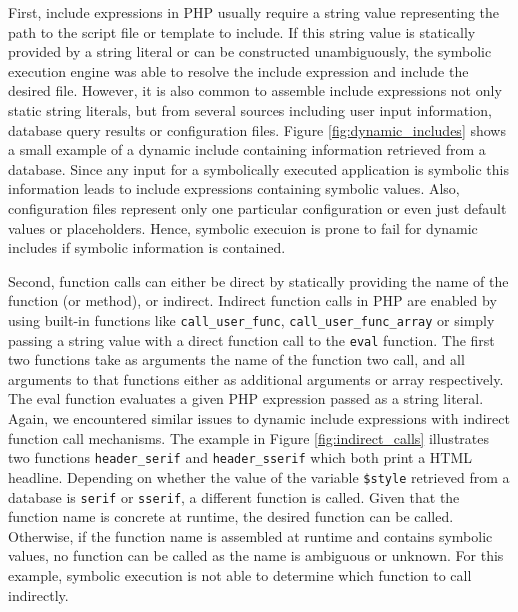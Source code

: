 \documentclass[sigconf]{acmart}
\renewcommand{\tt}[1]{\texttt{#1}}
\begin{document}
First, include expressions in PHP usually require a string value representing
the path to the script file or template to include. If this string value is
statically provided by a string literal or can be constructed unambiguously, the
symbolic execution engine was able to resolve the include expression and include
the desired file. However, it is also common to assemble include expressions not
only static string literals, but from several sources including user input
information, database query results or configuration files. Figure
\ref{fig:dynamic_includes} shows a small example of a dynamic include containing
information retrieved from a database. Since any input for a symbolically
executed application is symbolic this information leads to include expressions
containing symbolic values. Also, configuration files represent only one
particular configuration or even just default values or placeholders. Hence, 
symbolic execuion is prone to fail for dynamic includes if symbolic information
is contained.

Second, function calls can either be direct by statically providing the name of
the function (or method), or indirect. Indirect function calls in PHP are
enabled by using built-in functions like \tt{call\_user\_func},
\tt{call\_user\_func\_array} or simply passing a string value with a direct
function call to the \tt{eval} function. The first two functions take as
arguments the name of the function two call, and all arguments to that functions either as additional arguments or
array respectively. The eval function evaluates a given PHP expression passed
as a string literal.
Again, we encountered similar issues to dynamic include expressions with
indirect function call mechanisms. The example in Figure
\ref{fig:indirect_calls} illustrates two functions \tt{header\_serif} and
\tt{header\_sserif} which both print a HTML headline. Depending on whether the
value of the variable \tt{\$style} retrieved from a database is \tt{serif} or
\tt{sserif}, a different function is called. Given that the function name is 
concrete at runtime, the desired function can be called. Otherwise, if the
function name is assembled at runtime and contains symbolic values, no function
can be called as the name is ambiguous or unknown. For this example, symbolic
execution is not able to determine which function to call indirectly.
\end{document}
